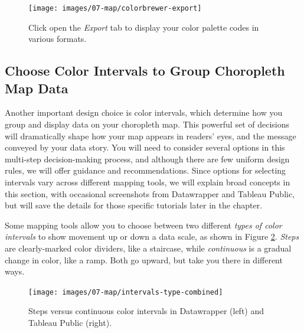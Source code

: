 \documentclass[
  english,
]{book}
\begin{document}
\begin{figure}
\texttt{[image: images/07-map/colorbrewer-export]} \caption{Click open the \emph{Export} tab to display your color palette codes in various formats.}\label{fig:colorbrewer-export}
\end{figure}

\hypertarget{choose-color-intervals-to-group-choropleth-map-data}{%
\subsection*{Choose Color Intervals to Group Choropleth Map Data}\label{choose-color-intervals-to-group-choropleth-map-data}}

Another important design choice is color intervals, which determine how you group and display data on your choropleth map. This powerful set of decisions will dramatically shape how your map appears in readers' eyes, and the message conveyed by your data story. You will need to consider several options in this multi-step decision-making process, and although there are few uniform design rules, we will offer guidance and recommendations. Since options for selecting intervals vary across different mapping tools, we will explain broad concepts in this section, with occasional screenshots from Datawrapper and Tableau Public, but will save the details for those specific tutorials later in the chapter.

Some mapping tools allow you to choose between two different \emph{types of color intervals} to show movement up or down a data scale, as shown in Figure \ref{fig:intervals-type-combined}. \emph{Steps} are clearly-marked color dividers, like a staircase, while \emph{continuous} is a gradual change in color, like a ramp. Both go upward, but take you there in different ways.



\begin{figure}
\texttt{[image: images/07-map/intervals-type-combined]} \caption{Steps versus continuous color intervals in Datawrapper (left) and Tableau Public (right).}\label{fig:intervals-type-combined}
\end{figure}
\end{document}
